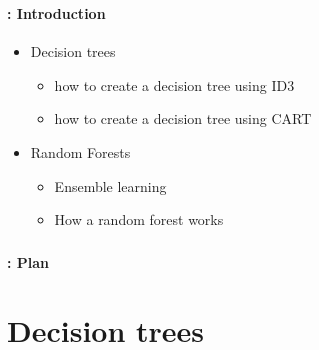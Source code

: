 \documentclass[xcolor=table]{beamer}
\subtitle[DT \& Ensemble]{Decision trees and Ensemble learning}
\begin{document}
	
\begin{frame}
	\frametitle{\inserttitle}
	\framesubtitle{\insertshortsubtitle: Introduction}
	
	\begin{itemize}
		\item Decision trees
		\begin{itemize}
			\item how to create a decision tree using ID3
			\item how to create a decision tree using CART
		\end{itemize}
		\item Random Forests
		\begin{itemize}
			\item Ensemble learning
			\item How a random forest works
		\end{itemize}
	\end{itemize}

\end{frame}


\begin{frame}
	\frametitle{\inserttitle}
	\framesubtitle{\insertshortsubtitle: Plan}
	
	\begin{multicols}{2}
		\tableofcontents
	\end{multicols}
\end{frame}

\section{Decision trees}
\end{document}
